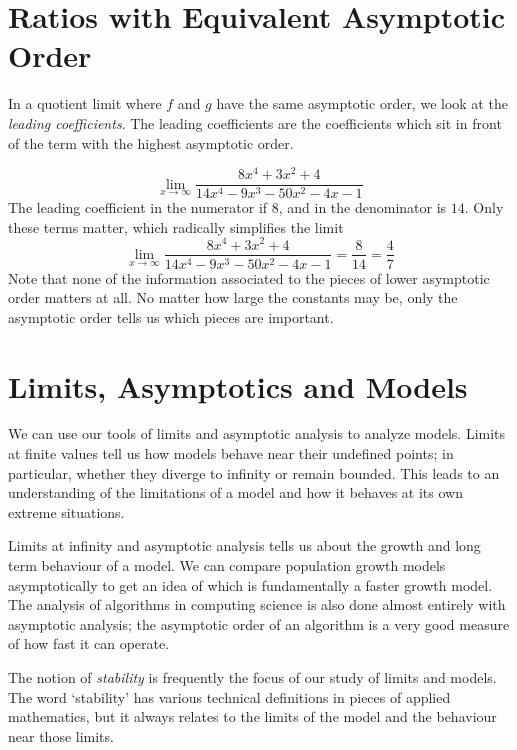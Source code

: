 \documentclass[fleqn]{report}
\begin{document}
\section{Ratios with Equivalent Asymptotic Order}
\label{ratios}

In a quotient limit where $f$ and $g$ have the same asymptotic
order, we look at the \emph{leading coefficients}. The leading
coefficients are the coefficients which sit in front of the
term with the highest asymptotic order. 

\begin{example}
\begin{equation*}
\lim_{x \rightarrow \infty} \frac{8x^4 + 3x^2 + 4}{14x^4 -
9x^3 - 50x^2 - 4x - 1}
\end{equation*}
The leading coefficient in the numerator if $8$, and in the
denominator is $14$. Only these terms matter, which radically
simplifies the limit
\begin{equation*}
\lim_{x \rightarrow \infty} \frac{8x^4 + 3x^2 + 4}{14x^4 -
9x^3 - 50x^2 - 4x - 1} = \frac{8}{14} = \frac{4}{7}
\end{equation*}
Note that none of the information associated to the pieces of
lower asymptotic order matters at all. No matter how large
the constants may be, only the asymptotic order tells us which
pieces are important.
\end{example}

\section{Limits, Asymptotics and Models}
\label{limits-asymptotics-models}

We can use our tools of limits and asymptotic analysis to
analyze models. Limits at finite values tell us how models
behave near their undefined points; in particular, whether
they diverge to infinity or remain bounded. This leads to an
understanding of the limitations of a model and how it behaves
at its own extreme situations.

Limits at infinity and asymptotic analysis tells us about the
growth and long term behaviour of a model. We can compare
population growth models asymptotically to get an idea of
which is fundamentally a faster growth model. The analysis of
algorithms in computing science is also done almost entirely
with asymptotic analysis; the asymptotic order of an algorithm
is a very good measure of how fast it can operate. 

The notion of \emph{stability} is frequently the focus of our
study of limits and models. The word `stability' has various
technical definitions in pieces of applied mathematics, but it
always relates to the limits of the model and the behaviour
near those limits. 
\end{document}
